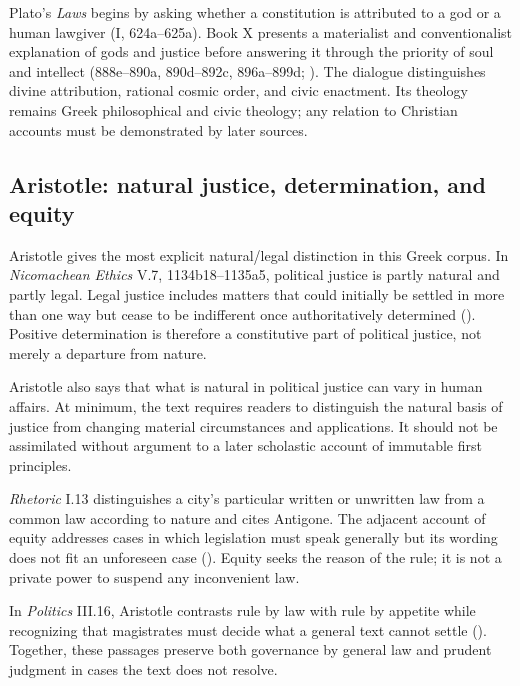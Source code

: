 Plato's \emph{Laws} begins by asking whether a constitution is attributed to a god or a human lawgiver (I, 624a--625a). Book X presents a materialist and conventionalist explanation of gods and justice before answering it through the priority of soul and intellect (888e--890a, 890d--892c, 896a--899d; ). The dialogue distinguishes divine attribution, rational cosmic order, and civic enactment. Its theology remains Greek philosophical and civic theology; any relation to Christian accounts must be demonstrated by later sources.

\subsection{Aristotle: natural justice, determination, and equity}

Aristotle gives the most explicit natural/legal distinction in this Greek corpus. In \emph{Nicomachean Ethics} V.7, 1134b18--1135a5, political justice is partly natural and partly legal. Legal justice includes matters that could initially be settled in more than one way but cease to be indifferent once authoritatively determined (). Positive determination is therefore a constitutive part of political justice, not merely a departure from nature.

Aristotle also says that what is natural in political justice can vary in human affairs. At minimum, the text requires readers to distinguish the natural basis of justice from changing material circumstances and applications. It should not be assimilated without argument to a later scholastic account of immutable first principles.

\emph{Rhetoric} I.13 distinguishes a city's particular written or unwritten law from a common law according to nature and cites Antigone. The adjacent account of equity addresses cases in which legislation must speak generally but its wording does not fit an unforeseen case (). Equity seeks the reason of the rule; it is not a private power to suspend any inconvenient law.

In \emph{Politics} III.16, Aristotle contrasts rule by law with rule by appetite while recognizing that magistrates must decide what a general text cannot settle (). Together, these passages preserve both governance by general law and prudent judgment in cases the text does not resolve.

